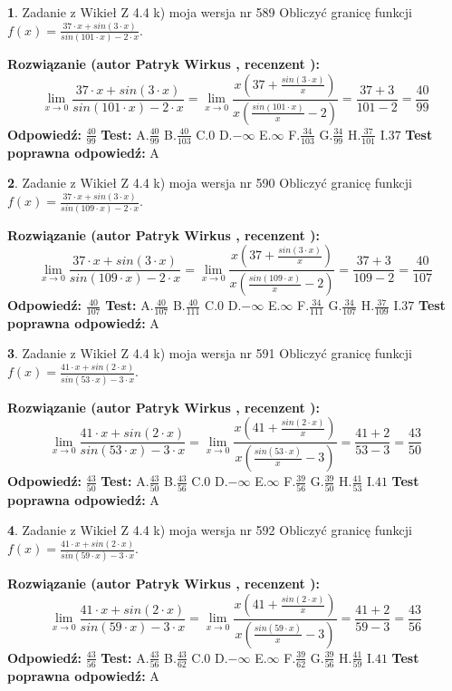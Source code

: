 \documentclass[12pt, a4paper]{article}
\theoremstyle{definition} %
\newtheorem{zad}{}
\newcommand{\zadStart}[1]{\begin{zad}#1\newline}
\newcommand{\zadStop}{\end{zad}}
\newcommand{\rozwStart}[2]{\noindent \textbf{Rozwiązanie (autor #1 , recenzent #2): }\newline}
\newcommand{\rozwStop}{\newline}
\newcommand{\odpStart}{\noindent \textbf{Odpowiedź:}\newline}
\newcommand{\odpStop}{\newline}
\newcommand{\testStart}{\noindent \textbf{Test:}\newline}
\newcommand{\testStop}{\newline}
\newcommand{\kluczStart}{\noindent \textbf{Test poprawna odpowiedź:}\newline}
\newcommand{\kluczStop}{\newline}
\begin{document}
\zadStart{Zadanie z Wikieł Z 4.4 k) moja wersja nr 589}
Obliczyć granicę funkcji $f(x)=\frac{37\cdot x +sin(3\cdot x)}{sin(101\cdot x) -2\cdot x}$.
\zadStop
\rozwStart{Patryk Wirkus}{}
$$\lim\limits_{x\to 0}\frac{37\cdot x +sin(3\cdot x)}{sin(101\cdot x) -2\cdot x}
=\lim\limits_{x\to 0}\frac{x(37+\frac{sin(3\cdot x)}{x})}{x(\frac{sin(101\cdot x)}{x}-2)}
=\frac{37+3}{101-2} = \frac{40}{99}$$
\rozwStop
\odpStart
$\frac{40}{99}$
\odpStop
\testStart
A.$\frac{40}{99}$
B.$\frac{40}{103}$
C.$0$
D.$-\infty$
E.$\infty$
F.$\frac{34}{103}$
G.$\frac{34}{99}$
H.$\frac{37}{101}$
I.$37$
\testStop
\kluczStart
A
\kluczStop



\zadStart{Zadanie z Wikieł Z 4.4 k) moja wersja nr 590}
Obliczyć granicę funkcji $f(x)=\frac{37\cdot x +sin(3\cdot x)}{sin(109\cdot x) -2\cdot x}$.
\zadStop
\rozwStart{Patryk Wirkus}{}
$$\lim\limits_{x\to 0}\frac{37\cdot x +sin(3\cdot x)}{sin(109\cdot x) -2\cdot x}
=\lim\limits_{x\to 0}\frac{x(37+\frac{sin(3\cdot x)}{x})}{x(\frac{sin(109\cdot x)}{x}-2)}
=\frac{37+3}{109-2} = \frac{40}{107}$$
\rozwStop
\odpStart
$\frac{40}{107}$
\odpStop
\testStart
A.$\frac{40}{107}$
B.$\frac{40}{111}$
C.$0$
D.$-\infty$
E.$\infty$
F.$\frac{34}{111}$
G.$\frac{34}{107}$
H.$\frac{37}{109}$
I.$37$
\testStop
\kluczStart
A
\kluczStop



\zadStart{Zadanie z Wikieł Z 4.4 k) moja wersja nr 591}
Obliczyć granicę funkcji $f(x)=\frac{41\cdot x +sin(2\cdot x)}{sin(53\cdot x) -3\cdot x}$.
\zadStop
\rozwStart{Patryk Wirkus}{}
$$\lim\limits_{x\to 0}\frac{41\cdot x +sin(2\cdot x)}{sin(53\cdot x) -3\cdot x}
=\lim\limits_{x\to 0}\frac{x(41+\frac{sin(2\cdot x)}{x})}{x(\frac{sin(53\cdot x)}{x}-3)}
=\frac{41+2}{53-3} = \frac{43}{50}$$
\rozwStop
\odpStart
$\frac{43}{50}$
\odpStop
\testStart
A.$\frac{43}{50}$
B.$\frac{43}{56}$
C.$0$
D.$-\infty$
E.$\infty$
F.$\frac{39}{56}$
G.$\frac{39}{50}$
H.$\frac{41}{53}$
I.$41$
\testStop
\kluczStart
A
\kluczStop



\zadStart{Zadanie z Wikieł Z 4.4 k) moja wersja nr 592}
Obliczyć granicę funkcji $f(x)=\frac{41\cdot x +sin(2\cdot x)}{sin(59\cdot x) -3\cdot x}$.
\zadStop
\rozwStart{Patryk Wirkus}{}
$$\lim\limits_{x\to 0}\frac{41\cdot x +sin(2\cdot x)}{sin(59\cdot x) -3\cdot x}
=\lim\limits_{x\to 0}\frac{x(41+\frac{sin(2\cdot x)}{x})}{x(\frac{sin(59\cdot x)}{x}-3)}
=\frac{41+2}{59-3} = \frac{43}{56}$$
\rozwStop
\odpStart
$\frac{43}{56}$
\odpStop
\testStart
A.$\frac{43}{56}$
B.$\frac{43}{62}$
C.$0$
D.$-\infty$
E.$\infty$
F.$\frac{39}{62}$
G.$\frac{39}{56}$
H.$\frac{41}{59}$
I.$41$
\testStop
\kluczStart
A
\kluczStop
\end{document}
